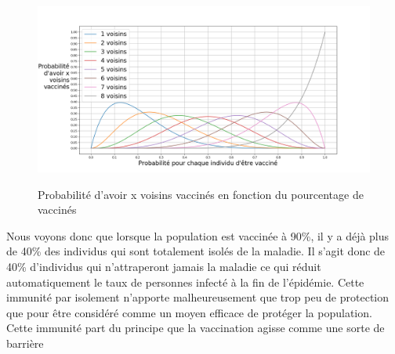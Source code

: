 \documentclass[journal, a4paper]{IEEEtran}
\begin{document}
	\begin{figure}[!hbt]
		\caption{Probabilité d'avoir x voisins vaccinés en fonction du pourcentage de vaccinés}
		\includegraphics[width=\columnwidth]{probNeighbour}
		\label{fig:probNeighbour}
	\end{figure}

	Nous voyons donc que lorsque la population est vaccinée à 90\%, il y a déjà plus de 40\% des individus qui sont totalement isolés de la maladie. Il s'agit donc de 40\% d'individus qui n'attraperont jamais la maladie ce qui réduit automatiquement le taux de personnes infecté à la fin de l'épidémie. Cette immunité par isolement n'apporte malheureusement que trop peu de protection que pour être considéré comme un moyen efficace de protéger la population. Cette immunité part du principe que la vaccination agisse comme une sorte de barrière \cite{vaccine_as_barrier}
\end{document}

